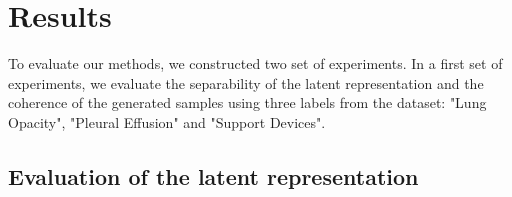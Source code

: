 \section{Results}

To evaluate our methods, we constructed two set of experiments.
In a first set of experiments, we evaluate the separability of the latent representation and the coherence of the generated samples using three labels from the dataset: "Lung Opacity", "Pleural Effusion" and "Support Devices".

\subsection{Evaluation of the latent representation}



%
%
%
